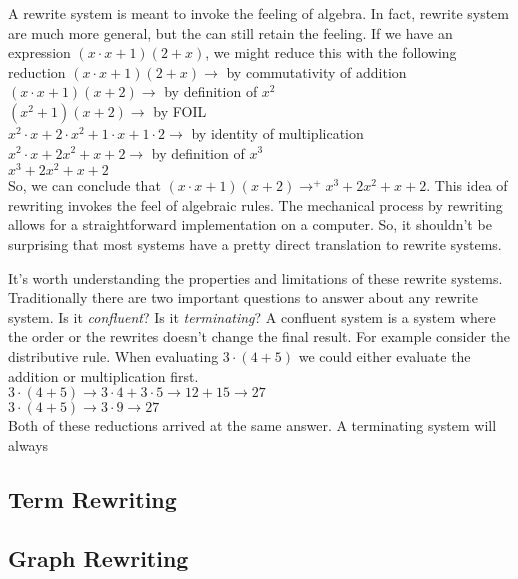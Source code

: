 \documentclass{article}
\begin{document}
A rewrite system is meant to invoke the feeling of algebra.
In fact, rewrite system are much more general, but the can still retain the feeling.
If we have an expression $(x\cdot x + 1)(2 + x)$, we might reduce this with the following reduction
$(x\cdot x + 1)(2 + x) \rightarrow$ by commutativity of addition\\
$(x\cdot x + 1)(x + 2) \rightarrow$ by definition of $x^2$\\
$(x^2 + 1)(x + 2) \rightarrow$ by FOIL\\
$x^2\cdot x + 2\cdot x^2 + 1\cdot x + 1 \cdot 2 \rightarrow$ by identity of multiplication\\
$x^2\cdot x + 2x^2 + x + 2 \rightarrow$ by definition of $x^3$\\
$x^3 + 2x^2 + x + 2$ \\

So, we can conclude that $(x\cdot x + 1)(x + 2) \rightarrow^+ x^3 + 2x^2 + x + 2$.
This idea of rewriting invokes the feel of algebraic rules.
The mechanical process by rewriting allows for a straightforward implementation on a computer.
So, it shouldn't be surprising that most systems have a pretty direct translation to rewrite systems.

It's worth understanding the properties and limitations of these rewrite systems.
Traditionally there are two important questions to answer about any rewrite system.
Is it \textit{confluent}? Is it \textit{terminating}?
A confluent system is a system where the order or the rewrites doesn't change the final result.
For example consider the distributive rule.
When evaluating $3\cdot(4 + 5)$ we could either evaluate the addition or multiplication first.\\
$3\cdot(4 + 5) \rightarrow 3\cdot 4 + 3\cdot 5 \rightarrow 12 + 15 \rightarrow 27$\\
$3\cdot(4 + 5) \rightarrow 3\cdot 9 \rightarrow 27$\\
Both of these reductions arrived at the same answer.
A terminating system will always

\subsection{Term Rewriting}
\subsection{Graph Rewriting}
\end{document}
